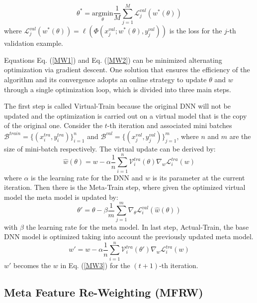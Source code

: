 \documentclass[runningheads]{llncs}
\begin{document}
	\begin{equation}\label{MW2}
		\theta^* = \underset{\theta}{\mathrm{argmin}} \frac{1}{M} \sum_{j=1}^{M} \mathcal{L}_j^{val}(w^*(\theta))
	\end{equation}
	where $ \mathcal{L}_j^{val}(w^*(\theta)) = \ell( \Phi(x_j^{val};w^*(\theta),y_j^{val}  ) )$ is the loss for the $j$-th validation example.
	
	Equations Eq. (\ref{MW1}) and Eq. (\ref{MW2}) can be minimized alternating optimization via gradient descent. One solution that ensures the efficiency of the algorithm and its convergence \cite{shu2019meta} adopts an online strategy to update $\theta$ and $w$ through a single optimization loop, which is divided into three main steps.
	
	The first step is called Virtual-Train because the original DNN will not be updated and the optimization is carried out on a virtual model that is the copy of the original one. Consider the $t$-th iteration and associated mini batches $\mathcal{B}^{train} = \{ (x_i^{tra},y_i^{tra}) \}_{i=1}^n$ and $\mathcal{B}^{val} = \{ (x_j^{val},y_j^{val}) \}_{j=1}^m$, where $n$ and $m$ are the size of mini-batch respectively. The virtual update can be derived by:
	\begin{equation}\label{MW3}
		\hat{w}(\theta) = w - \alpha \frac{1}{n}\sum_{i=1}^{n}\mathcal{V}_i^{tra}(\theta)\nabla_w\mathcal{L}_i^{tra}(w)
	\end{equation}
	where $\alpha$ is the learning rate for the DNN and $w$ is its parameter at the current iteration. Then there is the Meta-Train step, where given the optimized virtual model the meta model is updated by:
	\begin{equation}\label{MW4}
		\theta' = \theta - \beta \frac{1}{m}\sum_{j=1}^{m}\nabla_\theta\mathcal{L}_i^{val}(\hat{w}(\theta))
	\end{equation}
	with $\beta$ the learning rate for the meta model. In last step, Actual-Train, the base DNN model is optimized taking into account the previously updated meta model.
	\begin{equation}\label{MW5}
		w' =  w - \alpha \frac{1}{n}\sum_{i=1}^{n}\mathcal{V}_i^{tra}(\theta')\nabla_w\mathcal{L}_i^{tra}(w)
	\end{equation}
	$w'$ becomes the $w$ in Eq. (\ref{MW3}) for the $(t+1)$-th iteration.
	
	
	\subsection{Meta Feature Re-Weighting (MFRW)}\label{mfrw}
	
\end{document}
